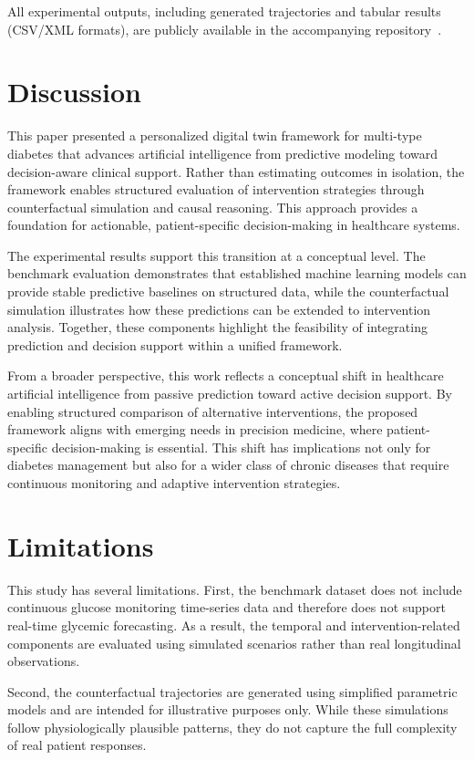 \documentclass[journal]{IEEEtran}
\begin{document}
All experimental outputs, including generated trajectories and tabular results (CSV/XML formats), are publicly available in the accompanying repository~\cite{ref41}.

\section{Discussion}
This paper presented a personalized digital twin framework for multi-type diabetes that advances artificial intelligence from predictive modeling toward decision-aware clinical support. Rather than estimating outcomes in isolation, the framework enables structured evaluation of intervention strategies through counterfactual simulation and causal reasoning. This approach provides a foundation for actionable, patient-specific decision-making in healthcare systems.

The experimental results support this transition at a conceptual level. The benchmark evaluation demonstrates that established machine learning models can provide stable predictive baselines on structured data, while the counterfactual simulation illustrates how these predictions can be extended to intervention analysis. Together, these components highlight the feasibility of integrating prediction and decision support within a unified framework.

From a broader perspective, this work reflects a conceptual shift in healthcare artificial intelligence from passive prediction toward active decision support. By enabling structured comparison of alternative interventions, the proposed framework aligns with emerging needs in precision medicine, where patient-specific decision-making is essential. This shift has implications not only for diabetes management but also for a wider class of chronic diseases that require continuous monitoring and adaptive intervention strategies.

\section{Limitations}
This study has several limitations. First, the benchmark dataset does not include continuous glucose monitoring time-series data and therefore does not support real-time glycemic forecasting. As a result, the temporal and intervention-related components are evaluated using simulated scenarios rather than real longitudinal observations.

Second, the counterfactual trajectories are generated using simplified parametric models and are intended for illustrative purposes only. While these simulations follow physiologically plausible patterns, they do not capture the full complexity of real patient responses.
\end{document}
